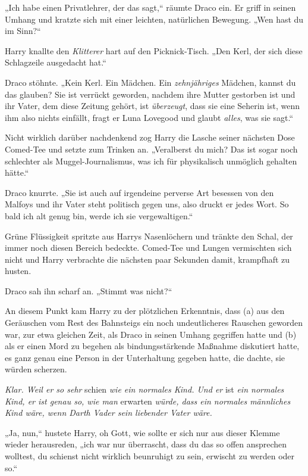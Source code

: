 {„Ich habe einen Privatlehrer, der das sagt,“ räumte Draco ein. Er griff in seinen Umhang und kratzte sich mit einer leichten, natürlichen Bewegung. „Wen hast du im Sinn?“

Harry knallte den \emph{Klitterer} hart auf den Picknick-Tisch. „Den Kerl, der sich diese Schlagzeile ausgedacht hat.“

Draco stöhnte. „Kein Kerl. Ein Mädchen. Ein \emph{zehnjähriges} Mädchen, kannst du das glauben? Sie ist verrückt geworden, nachdem ihre Mutter gestorben ist und ihr Vater, dem diese Zeitung gehört, ist \emph{überzeugt}, dass sie eine Seherin ist, wenn ihm also nichts einfällt, fragt er Luna Lovegood und glaubt \emph{alles}, was sie sagt.“

Nicht wirklich darüber nachdenkend zog Harry die Lasche seiner nächsten Dose Comed-Tee und setzte zum Trinken an. „Veralberst du mich? Das ist sogar noch schlechter als Muggel-Journalismus, was ich für physikalisch unmöglich gehalten hätte.“

Draco knurrte. „Sie ist auch auf irgendeine perverse Art besessen von den Malfoys und ihr Vater steht politisch gegen uns, also druckt er jedes Wort. So bald ich alt genug bin, werde ich sie vergewaltigen.“

Grüne Flüssigkeit spritzte aus Harrys Nasenlöchern und tränkte den Schal, der immer noch diesen Bereich bedeckte. Comed-Tee und Lungen vermischten sich nicht und Harry verbrachte die nächsten paar Sekunden damit, krampfhaft zu husten.

Draco sah ihn scharf an. „Stimmt was nicht?“

An diesem Punkt kam Harry zu der plötzlichen Erkenntnis, dass (a) aus den Geräuschen vom Rest des Bahnsteigs ein noch undeutlicheres Rauschen geworden war, zur etwa gleichen Zeit, als Draco in seinen Umhang gegriffen hatte und (b) als er einen Mord zu begehen als bindungsstärkende Maßnahme diskutiert hatte, es ganz genau eine Person in der Unterhaltung gegeben hatte, die dachte, sie würden scherzen.

\emph{Klar. Weil er so sehr} schien \emph{wie ein normales Kind. Und er} ist \emph{ein normales Kind, er ist genau so, wie man} erwarten \emph{würde, dass ein normales männliches Kind wäre, wenn Darth Vader sein liebender Vater wäre.}

„Ja, nun,“ hustete Harry, oh Gott, wie sollte er sich nur aus dieser Klemme wieder herausreden, „ich war nur überrascht, dass du das so offen ansprechen wolltest, du schienst nicht wirklich beunruhigt zu sein, erwischt zu werden oder so.“

}
